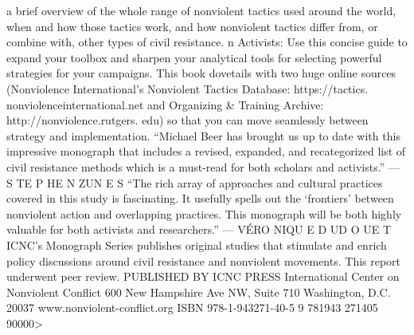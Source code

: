 \documentclass[twoside,a4paper,12pt,fleqn,openany]{extbook}
\begin{document}
a brief overview of the whole range of
nonviolent tactics used around the world,
when and how those tactics work, and how
nonviolent tactics differ from, or combine
with, other types of civil resistance.
n Activists: Use this concise guide to expand
your toolbox and sharpen your analytical
tools for selecting powerful strategies for
your campaigns.
This book dovetails with two huge online
sources (Nonviolence International’s
Nonviolent Tactics Database: https://tactics.
nonviolenceinternational.net and Organizing &
Training Archive: http://nonviolence.rutgers.
edu) so that you can move seamlessly between
strategy and implementation.
“Michael Beer has brought us up to date with this impressive
monograph that includes a revised, expanded, and recategorized
list of civil resistance methods which is a must-read for both
scholars and activists.” — S TE P HE N ZUN E S
“The rich array of approaches and cultural practices covered in
this study is fascinating. It usefully spells out the ‘frontiers’ between
nonviolent action and overlapping practices. This monograph
will be both highly valuable for both activists and researchers.”
— VÉRO NIQU E D UD O UE T
ICNC’s Monograph Series publishes original studies
that stimulate and enrich policy discussions around
civil resistance and nonviolent movements.
This report underwent peer review.
PUBLISHED BY ICNC PRESS
International Center on Nonviolent Conflict
600 New Hampshire Ave NW, Suite 710
Washington, D.C. 20037
www.nonviolent-conflict.org
ISBN 978-1-943271-40-5
9 781943 271405
90000>
\end{document}
